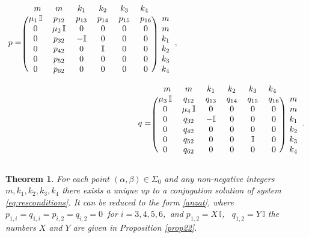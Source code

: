 \documentclass{article}
\theoremstyle{plain}
\newtheorem{theorem}{Theorem}
\begin{document}
\begin{equation} \label{anzat}
    \begin{multlined}
        p
        =
        \begin{blockarray}{ccccccc}
          \,\,\, m & m & k_1 & k_2 & k_3 & k_4 \,\,\, &  \\
        \begin{block}{(cccccc)c}
          \mu_1 \, \mathbb{I} & p_{12} & p_{13} & p_{14} & p_{15} & p_{16} & m  \\
          0 & \mu_2 \, \mathbb{I} & 0 & 0 & 0 & 0 & m  \\
          0 & p_{32} & - \mathbb{I} & 0 & 0 & 0 & k_1  \\
          0 & p_{42} & 0 & \mathbb{I} & 0 & 0 & k_2  \\
          0 & p_{52} & 0 & 0 & 0 & 0 & k_3  \\
          0 & p_{62} & 0 & 0 & 0 & 0 & k_4  \\
        \end{block}
        \end{blockarray},
        \hspace{5cm}
        \\
        q
        =
        \begin{blockarray}{ccccccc}
          \,\,\, m & m & k_1 & k_2 & k_3 & k_4 \,\,\, &  \\
        \begin{block}{(cccccc)c}
          \mu_3 \, \mathbb{I} & q_{12} & q_{13} & q_{14} & q_{15} & q_{16} & m  \\
          0 & \mu_4 \, \mathbb{I} & 0 & 0 & 0 & 0 & m  \\
          0 & q_{32} & - \mathbb{I} & 0 & 0 & 0 & k_1  \\
          0 & q_{42} & 0 & 0 & 0 & 0 & k_2  \\
          0 & q_{52} & 0 & 0 & \mathbb{I} & 0 & k_3  \\
          0 & q_{62} & 0 & 0 & 0 & 0 & k_4  \\
        \end{block}
        \end{blockarray}.
    \end{multlined}
\end{equation}

\begin{theorem}\label{theo2} For each point $(\alpha,\beta)\in \Sigma_0$ and any non-negative integers $m, k_1,k_2,k_3, k_4$ there exists a unique up to a conjugation solution of system \eqref{eq:resconditions}. It can be reduced to the form \eqref{anzat}, where $p_{1,i}=q_{1,i}=p_{i,2}=q_{i,2}=0$ \,for $ i=3,4,5,6$,\, and $p_{1,2}=X\, {\mathbb I}$, \, $q_{1,2}=Y\, {\mathbb I}$ \text{\rm{(}}the numbers $X$ and $Y$ are given in Proposition {\rm \ref{prop22}\text{\rm{)}}}.
 \end{theorem}
\end{document}
